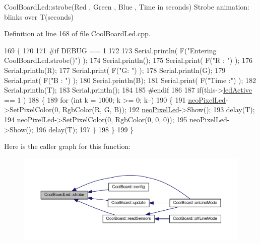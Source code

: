 Cool\+Board\+Led\+::strobe(\+Red , Green , Blue , Time in seconds) Strobe animation\+: blinks over T(seconds) 

Definition at line 168 of file Cool\+Board\+Led.\+cpp.


\begin{DoxyCode}
169 \{
170 
171 \textcolor{preprocessor}{#if DEBUG == 1}
172 
173     Serial.println( F(\textcolor{stringliteral}{"Entering CoolBoardLed.strobe()"}) );
174     Serial.println();
175     Serial.print( F(\textcolor{stringliteral}{"R : "}) );
176     Serial.println(R);
177     Serial.print( F(\textcolor{stringliteral}{"G: "}) );
178     Serial.println(G);
179     Serial.print( F(\textcolor{stringliteral}{"B : "}) );
180     Serial.println(B);
181     Serial.print( F(\textcolor{stringliteral}{"Time :"}) );
182     Serial.println(T);
183     Serial.println();
184 
185 \textcolor{preprocessor}{#endif  }
186 
187     \textcolor{keywordflow}{if}(this->\hyperlink{class_cool_board_led_a5f17c135516fcf4b44ea8a096ba0177a}{ledActive} == 1 )
188     \{   
189         \textcolor{keywordflow}{for} (\textcolor{keywordtype}{int} k = 1000; k >= 0; k--) 
190         \{
191             \hyperlink{class_cool_board_led_ac2c13fa462a010cd9242bf297c013923}{neoPixelLed}->SetPixelColor(0, RgbColor(R, G, B));
192             \hyperlink{class_cool_board_led_ac2c13fa462a010cd9242bf297c013923}{neoPixelLed}->Show();
193             delay(T);
194             \hyperlink{class_cool_board_led_ac2c13fa462a010cd9242bf297c013923}{neoPixelLed}->SetPixelColor(0, RgbColor(0, 0, 0));
195             \hyperlink{class_cool_board_led_ac2c13fa462a010cd9242bf297c013923}{neoPixelLed}->Show();
196             delay(T);
197         \}
198     \}
199 \}
\end{DoxyCode}
Here is the caller graph for this function\+:\nopagebreak
\begin{figure}[H]
\begin{center}
\leavevmode
\includegraphics[width=350pt]{de/dc0/class_cool_board_led_ad5f0de4c628cbfbf49896042831c64ad_icgraph}
\end{center}
\end{figure}
\mbox{\label{class_cool_board_led_a30fadd4cbec17ceea428bf7a32207e87}} 
